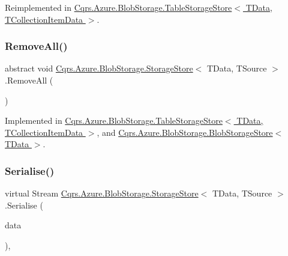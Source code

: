 Reimplemented in \hyperlink{classCqrs_1_1Azure_1_1BlobStorage_1_1TableStorageStore_ae775f039a168cc48c731314c7e494bb6_ae775f039a168cc48c731314c7e494bb6}{Cqrs.\+Azure.\+Blob\+Storage.\+Table\+Storage\+Store$<$ T\+Data, T\+Collection\+Item\+Data $>$}.

\mbox{\label{classCqrs_1_1Azure_1_1BlobStorage_1_1StorageStore_a4e848f342be903293812b3b660464d1a_a4e848f342be903293812b3b660464d1a}} 
\subsubsection{\texorpdfstring{Remove\+All()}{RemoveAll()}}
{\footnotesize\ttfamily abstract void \hyperlink{classCqrs_1_1Azure_1_1BlobStorage_1_1StorageStore}{Cqrs.\+Azure.\+Blob\+Storage.\+Storage\+Store}$<$ T\+Data, T\+Source $>$.Remove\+All (\begin{DoxyParamCaption}{ }\end{DoxyParamCaption})\hspace{0.3cm}{\ttfamily [pure virtual]}}



Implemented in \hyperlink{classCqrs_1_1Azure_1_1BlobStorage_1_1TableStorageStore_aadd66b35bfa105ef4446bd791e99a3d5_aadd66b35bfa105ef4446bd791e99a3d5}{Cqrs.\+Azure.\+Blob\+Storage.\+Table\+Storage\+Store$<$ T\+Data, T\+Collection\+Item\+Data $>$}, and \hyperlink{classCqrs_1_1Azure_1_1BlobStorage_1_1BlobStorageStore_a4371b95250e51b8462d8ab33b6f3fe9e_a4371b95250e51b8462d8ab33b6f3fe9e}{Cqrs.\+Azure.\+Blob\+Storage.\+Blob\+Storage\+Store$<$ T\+Data $>$}.

\mbox{\label{classCqrs_1_1Azure_1_1BlobStorage_1_1StorageStore_a8e5d4e50e054d963f96aaa4808794718_a8e5d4e50e054d963f96aaa4808794718}} 
\subsubsection{\texorpdfstring{Serialise()}{Serialise()}}
{\footnotesize\ttfamily virtual Stream \hyperlink{classCqrs_1_1Azure_1_1BlobStorage_1_1StorageStore}{Cqrs.\+Azure.\+Blob\+Storage.\+Storage\+Store}$<$ T\+Data, T\+Source $>$.Serialise (\begin{DoxyParamCaption}\item[{T\+Data}]{data }\end{DoxyParamCaption})\hspace{0.3cm}{\ttfamily [protected]}, {\ttfamily [virtual]}}

